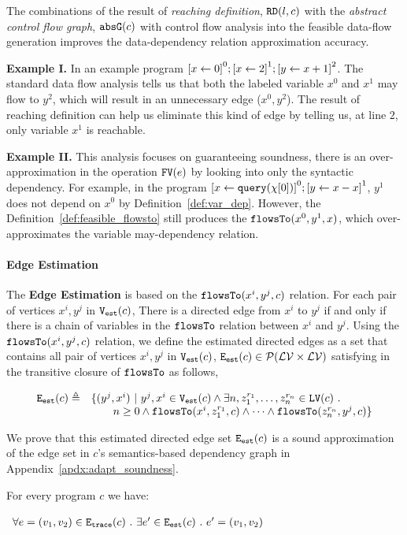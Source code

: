 The combinations of the result of \emph{reaching definition}, $\mathtt{RD}(l, c)$
with the \emph{abstract control flow graph}, $\mathtt{abs}{\mathtt{G}}(c)$ with control flow analysis into the feasible 
data-flow generation improves the data-dependency relation approximation accuracy. 

\textbf{Example I.}
In an example program $\clabel{\assign{x}{0}}^{0}; \clabel{\assign{x}{2}}^{1}; \clabel{\assign{y}{x + 1}}^{2}$. 
The standard data flow analysis 
tells us that both the labeled variable $x^{0}$ and $x^1$ may flow to $y^{2}$, which will result in an unnecessary edge ($x^{0}, y^{2}$). The result of reaching definition 
can help us eliminate this kind of edge by telling us, at line $2$, only variable $x^{1}$ is reachable. 

\textbf{Example II.}
This analysis focuses on guaranteeing soundness,
there is an over-approximation in the operation $\mathtt{FV}(e)$ by looking into only the syntactic dependency.
For example, in the program 
$\clabel{\assign{x}{\query(\chi[0])}}^{0}; \clabel{\assign{y}{x - x}}^{1}$,
$y^1$ does not depend on $x^0$ by Definition~\ref{def:var_dep}.
However, the Definition~\ref{def:feasible_flowsto} still produces the $\mathtt{flowsTo}(x^0, y^1, x)$, which over-approximates the variable may-dependency relation.

\paragraph{Edge Estimation}
The \textbf{Edge Estimation}
is based on the $\mathtt{flowsTo}(x^i, y^j, c)$ relation.
For each pair of vertices $x^i, y^j$ in $\mathtt{{V_{est}}}(c)$,
There is a directed edge from $x^i$ to $y^j$ if and only if there is a chain of variables 
in the $\mathtt{flowsTo}$ relation between $x^i$ and $y^j$. 
Using the $\mathtt{flowsTo}(x^i, y^j, c)$ relation, we define the estimated directed edges as a set that contains all
pair of vertices $x^i, y^j$ in $\mathtt{{V_{est}}}(c)$, 
$\mathtt{{E_{est}}}(c) \in \mathcal{P}( \mathcal{LV} \times \mathcal{LV})$
satisfying in the transitive closure of $\mathtt{flowsTo}$ as follows,

\[
 \begin{array}{ll}
 \mathtt{{E_{est}}}(c) \triangleq &
 \{ 
 (y^j, x^i) ~ \vert ~ y^j, x^i \in \mathtt{{V_{est}}}(c)
 \land
 \exists n,
 z_1^{r_1}, \ldots, z_n^{r_n} \in \mathtt{LV}(c) ~.~ 
 \\ & \quad \quad
 n \geq 0 \land \mathtt{flowsTo}(x^i, z_1^{r_1}, c) 
 \land \cdots \land \mathtt{flowsTo}(z_n^{r_n}, y^j, c) 
 \}
 \end{array}
 \]

 We prove that this estimated directed edge set $\mathtt{{E_{est}}}(c)$ is a sound approximation of the 
edge set in $c$'s semantics-based dependency graph 
in Appendix~\ref{apdx:adapt_soundness}.
\begin{lem}
 For every program $c$ we have:
 \begin{center}
$
 \begin{array}{l}
 \forall e = (v_1, v_2) \in \mathtt{{E_{trace}}}(c)
 ~.~ 
 \exists e' \in \mathtt{{E_{est}}}(c) ~.~ e' = (v_1, v_2)
 \end{array}
$
\end{center} 
\end{lem}

